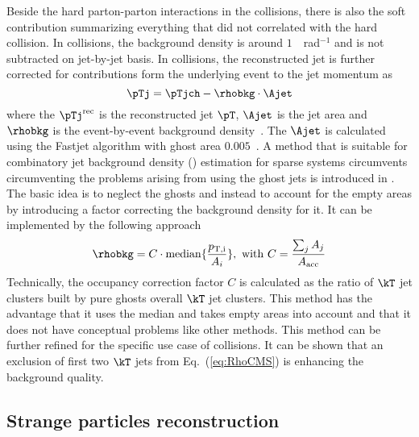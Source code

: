 Beside the hard parton-parton interactions in the collisions, there is also the soft contribution summarizing everything that did not correlated with the hard collision.
In \pp collisions, the background density is around $1$~\GeVc~rad$^{-1}$  and is not subtracted on jet-by-jet basis.
In \pPb collisions, the reconstructed jet is further corrected for contributions form the underlying event to the jet momentum as
\begin{equation}
\pTj = \pTjch - \rhobkg\cdot\Ajet
\label{eq:DeltaPt}
\end{equation}
where the $\pTj^{\rm rec}$ is the reconstructed jet $\pT$, $\Ajet$ is the jet area and $\rhobkg$ is the event-by-event background density~\cite{Cacciari:2007fd}.
The $\Ajet$ is calculated using the Fastjet algorithm with ghost area $0.005$~\cite{Cacciari:2008gn}.
A method that is suitable for combinatory jet background density (\rhobkg) estimation for sparse systems circumvents circumventing the problems arising from using the ghost jets is introduced in \cite{Chatrchyan:2012tt}.
The basic idea is to neglect the ghosts and instead to account for the empty areas by introducing a factor correcting the background density for it.
It can be implemented by the following approach
\begin{equation}
\rhobkg = C\cdot{\rm median}\{\frac{p_{\rm T,i}}{A_{i}}\},~{\rm with}~C = \frac{\sum_{j} A_{j}}{A_\mathrm{acc}}
\label{eq:RhoCMS}
\end{equation}
Technically, the occupancy correction factor $C$ is calculated as the ratio of $\kT$ jet clusters built by pure ghosts overall $\kT$ jet clusters.
This method has the advantage that it uses the median and takes empty areas into account and that it does not have conceptual problems like other methods.
This method can be further refined for the specific use case of \pPb collisions.
It can be shown that an exclusion of first two $\kT$ jets from Eq.~(\ref{eq:RhoCMS}) is enhancing the background quality.

\subsection{Strange particles reconstruction}%
\label{sec:ParRec}

